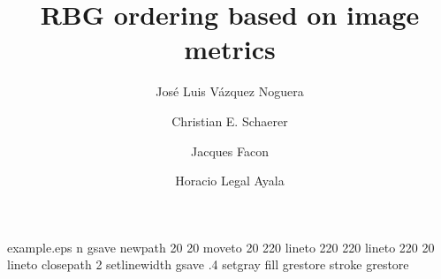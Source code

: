 %
%
%
%
%
\begin{filecontents*}{example.eps}
n%
gsave
newpath
  20 20 moveto
  20 220 lineto
  220 220 lineto
  220 20 lineto
closepath
2 setlinewidth
gsave
  .4 setgray fill
grestore
stroke
grestore
\end{filecontents*}
%
\documentclass[twocolumn,fleqn]{svjour3}
%
\smartqed  %
%
\usepackage[numbers]{natbib}
\usepackage{amssymb}
\usepackage{amsmath}
\usepackage{textcomp}
\usepackage[T1]{fontenc}
\usepackage[utf8]{inputenc}
\usepackage[english, spanish]{babel}
\usepackage{csquotes}
\usepackage{enumerate}
\usepackage{enumitem}
\usepackage{caption}
\captionsetup{compatibility=false}
\usepackage{subcaption}
\usepackage{listings}
\usepackage{array} %
\usepackage{multirow} %
\usepackage{nicefrac} %
\usepackage[dvipsnames]{xcolor}
\usepackage{pgfplots}
\pgfplotsset{compat=default}
\usepackage{pgfplotstable}
\usetikzlibrary{spy}
\usepackage{longtable}
\usepackage{array}
\usepackage{pdflscape}
\usepackage{booktabs}
\usepackage{graphicx} %



%
%
%
%
\journalname{}




\title{RBG ordering based on image metrics}
\author{
  Jos\'e Luis V\'azquez Noguera \and
  Christian E. Schaerer \and
  Jacques Facon	\and
  Horacio Legal Ayala
}


